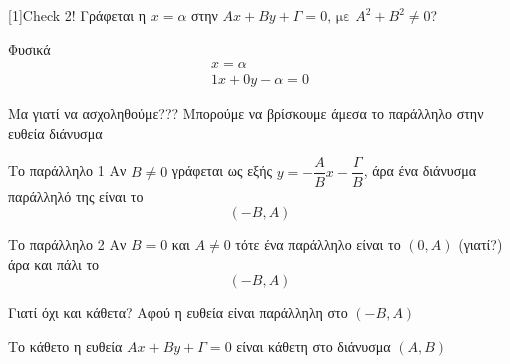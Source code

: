 \documentclass[greek]{beamer}
\begin{document}
\begin{frame}{\scalebox{-1}[1]{Check 2!}}
  Γράφεται η $x=α$ στην $Αx+Βy+Γ=0 \text{, με } Α^2+Β^2\ne 0$?

   Φυσικά
  \begin{align*}
    x=α \\
    1x+0y-α=0
  \end{align*}
\end{frame}

\begin{frame}{Μα γιατί να ασχοληθούμε???}
  Μπορούμε να βρίσκουμε άμεσα το παράλληλο στην ευθεία διάνυσμα
  \begin{block}{Το παράλληλο 1}
    Αν $Β\ne 0$ γράφεται ως εξής $y=-\dfrac{Α}{Β}x-\dfrac{Γ}{Β}$, άρα ένα διάνυσμα παράλληλό της είναι το $$(-Β,Α)$$
  \end{block}
  \begin{block}{Το παράλληλο 2}
    Αν $Β= 0$ και $Α\ne 0$ τότε ένα παράλληλο είναι το $(0,Α)$ (γιατί?) άρα και πάλι το $$(-Β,Α)$$
  \end{block}
\end{frame}

\begin{frame}{Γιατί όχι και κάθετα?}
  Αφού η ευθεία είναι παράλληλη στο $(-Β,Α)$
  \begin{block}{Το κάθετο}
    η ευθεία $Αx+Βy+Γ=0$ είναι κάθετη στο διάνυσμα $(Α,Β)$
  \end{block}

\end{frame}
\end{document}
